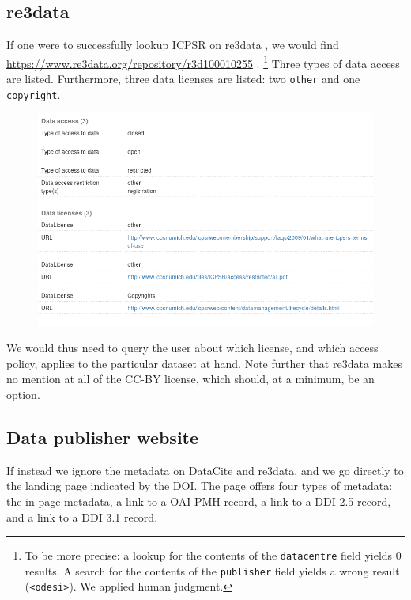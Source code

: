 \documentclass[10pt,letterpaper]{article}
\begin{document}
\subsection{re3data}
If one were to successfully lookup ICPSR on re3data \parencite{re3data}, we would find  \url{https://www.re3data.org/repository/r3d100010255} \parencite{Re3data-icpsr}.
\footnote{To be more precise: a lookup for the contents of the \texttt{datacentre} field yields 0 results. A search for the contents of the \texttt{publisher} field yields a wrong result (\lstinline|<odesi>|). We applied human judgment. } Three types of data access are listed. Furthermore, three data licenses are listed: two \texttt{other} and one \texttt{copyright}.
\begin{figure}[H]
	\includegraphics[width=1\textwidth]{re3data-org-icpsr-access-licenses-20181008.png}
\end{figure}

We would thus need to query the user about which license, and which access policy, applies to the particular dataset at hand. Note further that re3data makes no mention at all of the CC-BY license, which should, at a minimum, be an option.

\subsection{Data publisher website}
If instead we ignore the metadata on DataCite and re3data, and we go directly to the landing page indicated by the \ac{DOI}. The page offers four types of metadata: the in-page metadata, a link to a OAI-PMH record, a link to a DDI 2.5 record, and a link to a DDI 3.1 record.
\end{document}
